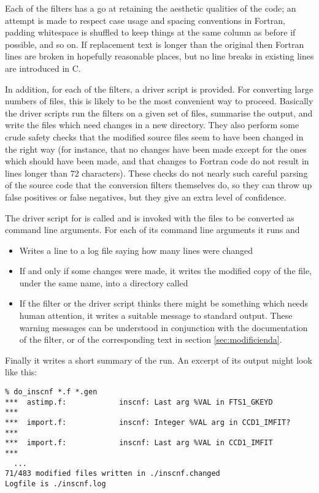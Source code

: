 \documentclass[twoside,11pt]{article}
\renewcommand{\_}{\texttt{\symbol{95}}}
\begin{document}
Each of the filters has a go at retaining the aesthetic 
qualities of the code; an attempt is made to respect 
case usage and spacing conventions in Fortran, 
padding whitespace is shuffled to keep things at the same column as
before if possible, and so on.
If replacement text is longer than the original
then Fortran lines are broken in hopefully reasonable places,
but no line breaks in existing lines are introduced in C.

In addition, for each of the filters, a driver script is provided. 
For converting large numbers of files, this is likely to be the 
most convenient way to proceed.  Basically the driver scripts 
run the filters on a given set of files, summarise the output, and
write the files which need changes in a new directory.
They also perform some crude safety checks that the modified source
files seem to have been changed in the right way (for instance, that
no changes have been made except for the ones which should have been
made, and that changes to Fortran code do not result in lines longer
than 72 characters).  
These checks do not nearly such careful parsing
of the source code that the conversion filters themselves do, so
they can throw up false positives or false negatives, but they give 
an extra level of confidence.

The driver script for  is called \file{do\_inscnf}
and is invoked with the files to be converted as command line arguments.
For each of its command line arguments it runs  and
\begin{itemize}
\item Writes a line to a log file  
      saying how many lines were changed
\item If and only if some changes were made, it writes the modified copy
      of the file, under the same name, 
      into a directory called 
\item If the filter or the driver script thinks there might be something 
      which needs human attention, it writes a suitable message to standard
      output.  These warning messages can be understood in conjunction 
      with the documentation of the filter, or of the corresponding 
      text in section \ref{sec:modificienda}.
\end{itemize}
Finally it writes a short summary of the run.
An excerpt of its output might look like this:
\begin{squote}
\begin{verbatim}
% do_inscnf *.f *.gen
***  astimp.f:            inscnf: Last arg %VAL in FTS1_GKEYD       ***
***  import.f:            inscnf: Integer %VAL arg in CCD1_IMFIT?   ***
***  import.f:            inscnf: Last arg %VAL in CCD1_IMFIT       ***
  ...
71/483 modified files written in ./inscnf.changed
Logfile is ./inscnf.log
\end{verbatim}
\end{squote}
\end{document}
